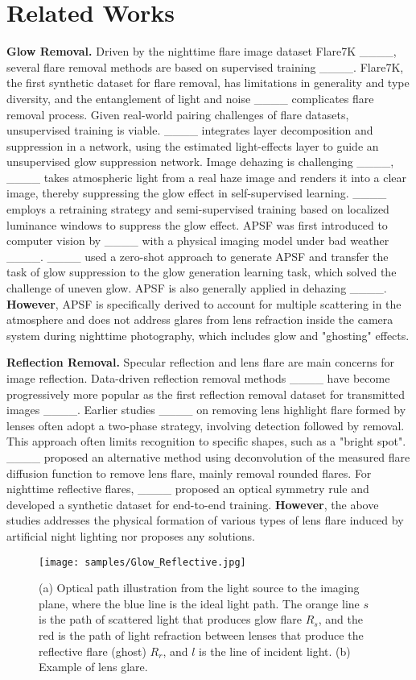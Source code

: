 \section{Related Works}
\noindent\textbf{Glow Removal. }
Driven by the nighttime flare image dataset Flare7K ____, several flare removal methods are based on supervised training ____. Flare7K, the first synthetic dataset for flare removal, has limitations in generality and type diversity, and the entanglement of light and noise ____ complicates flare removal process. 
Given real-world pairing challenges of flare datasets, unsupervised training is viable.
____ integrates layer decomposition and suppression in a network, using the estimated light-effects layer to guide an unsupervised glow suppression network. Image dehazing is challenging ____, ____ takes atmospheric light from a real haze image and renders it into a clear image, thereby suppressing the glow effect in self-supervised learning. ____ employs a retraining strategy and semi-supervised training based on localized luminance windows to suppress the glow effect. APSF was first introduced to computer vision by ____ with a physical imaging model under bad weather ____. ____ used a zero-shot approach to generate APSF and transfer the task of glow suppression to the glow generation learning task, which solved the challenge of uneven glow. APSF is also generally applied in dehazing ____. 
\textbf{However}, APSF is specifically derived to account for multiple scattering in the atmosphere and does not address glares from lens refraction inside the camera system during nighttime photography, which includes glow and "ghosting" effects.

\noindent\textbf{Reflection Removal. }
Specular reflection and lens flare are main concerns for image reflection. 
Data-driven reflection removal methods ____ have become progressively more popular as the first reflection removal dataset for transmitted images ____.
Earlier studies ____ on removing lens highlight flare formed by lenses often adopt a two-phase strategy, involving detection followed by removal. This approach often limits recognition to specific shapes, such as a "bright spot". ____ proposed an alternative method using deconvolution of the measured flare diffusion function to remove lens flare, mainly removal rounded flares.  
For nighttime reflective flares, ____ proposed an optical symmetry rule and developed a synthetic dataset for end-to-end training. \textbf{However}, the above studies addresses the physical formation of various types of lens flare induced by artificial night lighting nor proposes any solutions.
\begin{figure}[t]
\centering
\texttt{[image: samples/Glow\_Reflective.jpg]}
\caption{(a) Optical path illustration from the light source to the imaging plane, where the blue line is the ideal light path. The orange line $s$ is the path of scattered light that produces glow flare $R_{s}$, and the red is the path of light refraction between lenses that produce the reflective flare (ghost) $R_{r}$, and $l$ is the line of incident light. (b) Example of lens glare.}
\label{op}
\end{figure}